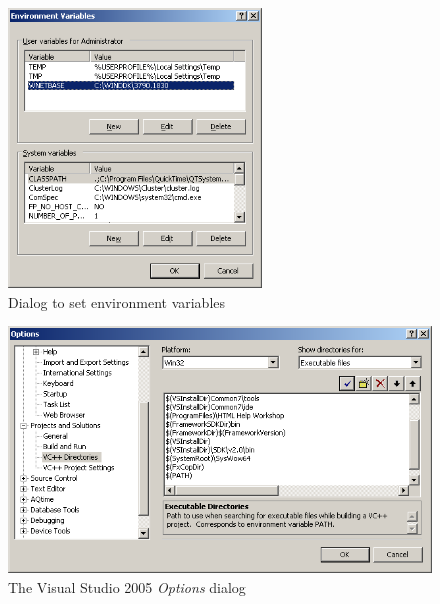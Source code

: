 \documentclass[a4paper,titlepage]{report}
\begin{document}
\begin{figure}[ht]
    \centering
    \caption{Dialog to set environment variables\label{fig:EnvironmentVariables}}
    \includegraphics[width=0.6\textwidth]{./EnvironmentVars.png}
\end{figure}

\begin{figure}[ht]
    \centering
    \caption{The Visual Studio 2005 \emph{Options} dialog\label{fig:VisualStudioOptionsDialog}}
    \includegraphics[width=\textwidth]{./VS2005_ExeDirs.png}
\end{figure}

\pagebreak{}\tableofcontents\thispagestyle{fancy}
\end{document}
